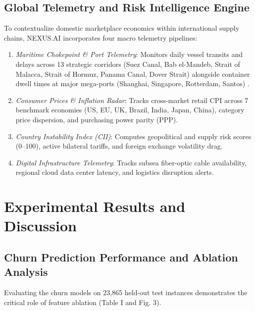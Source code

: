 \documentclass[conference]{IEEEtran}
\begin{document}
\subsection{Global Telemetry and Risk Intelligence Engine}
To contextualize domestic marketplace economics within international supply chains, NEXUS.AI incorporates four macro telemetry pipelines:
\begin{enumerate}
    \item \textit{Maritime Chokepoint & Port Telemetry}: Monitors daily vessel transits and delays across 13 strategic corridors (Suez Canal, Bab el-Mandeb, Strait of Malacca, Strait of Hormuz, Panama Canal, Dover Strait) alongside container dwell times at major mega-ports (Shanghai, Singapore, Rotterdam, Santos) .
    \item \textit{Consumer Prices & Inflation Radar}: Tracks cross-market retail CPI across 7 benchmark economies (US, EU, UK, Brazil, India, Japan, China), category price dispersion, and purchasing power parity (PPP).
    \item \textit{Country Instability Index (CII)}: Computes geopolitical and supply risk scores (0--100), active bilateral tariffs, and foreign exchange volatility drag.
    \item \textit{Digital Infrastructure Telemetry}: Tracks subsea fiber-optic cable availability, regional cloud data center latency, and logistics disruption alerts.
\end{enumerate}

\section{Experimental Results and Discussion}

\subsection{Churn Prediction Performance and Ablation Analysis}
Evaluating the churn models on 23,865 held-out test instances demonstrates the critical role of feature ablation (Table I and Fig. 3).
\end{document}
